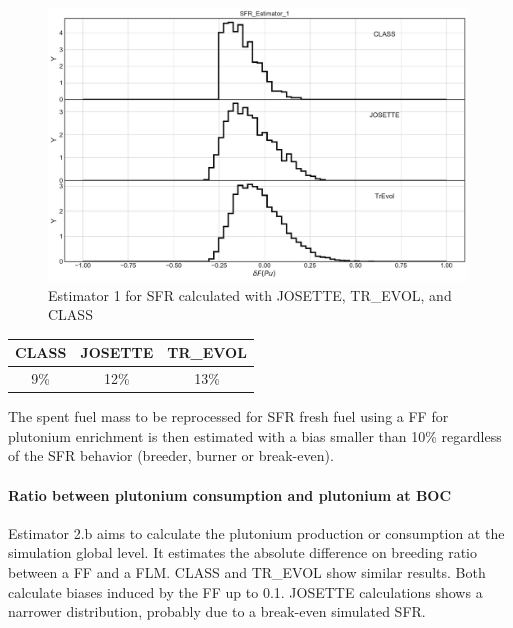 \begin{figure}[h]
	\begin{center}
		\includegraphics[width = 0.99\textwidth]{../../Feature_1/RAW_DATA/FIG/SFR_Estimator_1.pdf}
		\caption{Estimator 1 for \gls{SFR} calculated with JOSETTE, TR\_EVOL, and CLASS}
		\label{fig:Est1_SFR}
	\end{center}
\end{figure}

\begin{table}[h]
	\begin{center}
		\begin{tabular}{|c||c||c|}
			\hline 
				CLASS & JOSETTE & TR\_EVOL \\
			\hline
				9\% & 12\% & 13\% \\
			\hline
		\end{tabular}
	\end{center}
	\label{table:Est1Dev_SFR}
\end{table}

The spent fuel mass to be reprocessed for \gls{SFR} fresh fuel using a \gls{FF}
for plutonium enrichment is then estimated with a bias smaller than 10\%
regardless of the \gls{SFR} behavior (breeder, burner or break-even).  

\paragraph{Ratio between plutonium consumption and plutonium at \gls{BOC}}

Estimator 2.b aims to calculate the plutonium production or consumption at the
simulation global level. It estimates the absolute difference on breeding
ratio between a \gls{FF} and a \gls{FLM}. CLASS and TR\_EVOL show similar
results. Both calculate biases induced by the \gls{FF} up to 0.1. JOSETTE
calculations shows a narrower distribution, probably due to a
break-even simulated \gls{SFR}.   

